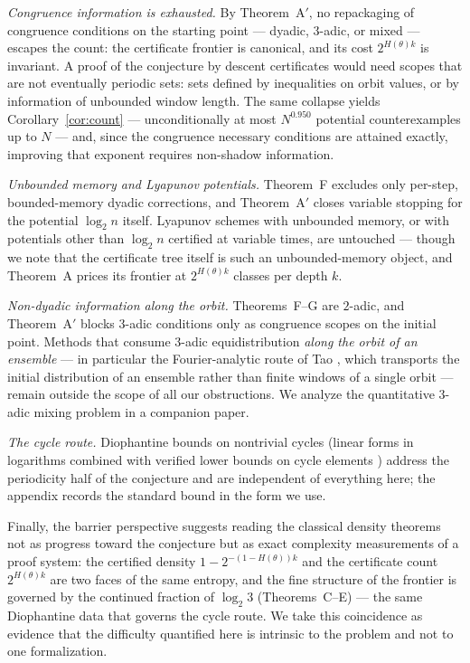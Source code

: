 \documentclass[11pt]{article}
\theoremstyle{definition}
\begin{document}
\emph{Congruence information is exhausted.} By Theorem~A$'$, no
repackaging of congruence conditions on the starting point --- dyadic,
$3$-adic, or mixed --- escapes the count: the certificate frontier is
canonical, and its cost $2^{H(\theta)k}$ is invariant. A proof of the
conjecture by descent certificates would need scopes that are not
eventually periodic sets: sets defined by inequalities on orbit values, or
by information of unbounded window length. The same collapse yields
Corollary~\ref{cor:count} --- unconditionally at most $N^{0.950}$
potential counterexamples up to $N$ --- and, since the congruence
necessary conditions are attained exactly, improving that exponent
requires non-shadow information.

\emph{Unbounded memory and Lyapunov potentials.} Theorem~F excludes only
per-step, bounded-memory dyadic corrections, and Theorem~A$'$ closes
variable stopping for the potential $\log_2 n$ itself. Lyapunov schemes
with unbounded memory, or with potentials other than $\log_2 n$ certified
at variable times, are untouched --- though we note that the certificate
tree itself is such an unbounded-memory object, and Theorem~A prices its frontier at
$2^{H(\theta)k}$ classes per depth $k$.

\emph{Non-dyadic information along the orbit.} Theorems~F--G are
$2$-adic, and Theorem~A$'$ blocks $3$-adic conditions only as congruence
scopes on the initial point. Methods that consume $3$-adic
equidistribution \emph{along the orbit of an ensemble} --- in particular
the Fourier-analytic route of Tao \cite{Tao2022}, which transports the
initial distribution of an ensemble rather than finite windows of a single
orbit --- remain outside the scope of all our obstructions. We analyze the
quantitative $3$-adic mixing problem in a companion paper.

\emph{The cycle route.} Diophantine bounds on nontrivial cycles (linear
forms in logarithms combined with verified lower bounds on cycle elements
\cite{Eliahou1993,SimonsDeWeger2005,Rhin1987,Barina2021}) address the
periodicity half of the conjecture and are independent of everything here;
the appendix records the standard bound in the form we use.

Finally, the barrier perspective suggests reading the classical density
theorems not as progress toward the conjecture but as exact complexity
measurements of a proof system: the certified density $1-2^{-(1-H(\theta))k}$
and the certificate count $2^{H(\theta)k}$ are two faces of the same
entropy, and the fine structure of the frontier is governed by the
continued fraction of $\log_2 3$ (Theorems~C--E) --- the same Diophantine
data that governs the cycle route. We take this coincidence as evidence
that the difficulty quantified here is intrinsic to the problem and not to
one formalization.
\end{document}
